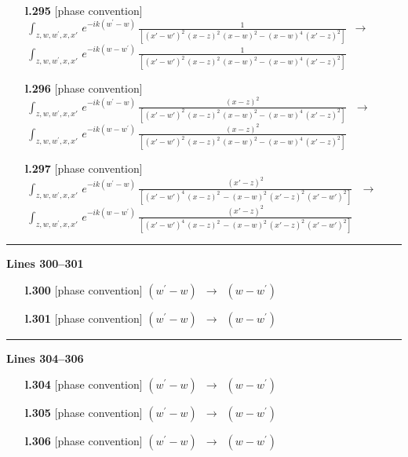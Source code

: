 \documentclass[10pt]{article}
\begin{document}
\begin{itemize}[leftmargin=2.2em,itemsep=1pt,topsep=2pt]
\item[\textbf{l.295}] \textsf{\small [phase convention]} $\displaystyle \,\int_{z,w,w^{\prime},x,x'}\, e^{-ik(w^{\prime}-w)}\, \frac{1}{[(x'-w')^{2}\,(x-z)^{2}\,(x-w)^{2} - (x-w)^{4}\, (x'-z)^{2}]}$\ $\longrightarrow$\ $\displaystyle \,\int_{z,w,w^{\prime},x,x'}\, e^{-ik(w-w^{\prime})}\, \frac{1}{[(x'-w')^{2}\,(x-z)^{2}\,(x-w)^{2} - (x-w)^{4}\, (x'-z)^{2}]}$
\item[\textbf{l.296}] \textsf{\small [phase convention]} $\displaystyle \,\int_{z,w,w^{\prime},x,x'}\, e^{-ik(w^{\prime}-w)}\, \frac{(x-z)^{2}}{[(x'-w')^{2}\,(x-z)^{2}\,(x-w)^{2} - (x-w)^{4}\, (x'-z)^{2}]}\,$\ $\longrightarrow$\ $\displaystyle \,\int_{z,w,w^{\prime},x,x'}\, e^{-ik(w-w^{\prime})}\, \frac{(x-z)^{2}}{[(x'-w')^{2}\,(x-z)^{2}\,(x-w)^{2} - (x-w)^{4}\, (x'-z)^{2}]}\,$
\item[\textbf{l.297}] \textsf{\small [phase convention]} $\displaystyle \,\int_{z,w,w^{\prime},x,x'}\, e^{-ik(w^{\prime}-w)}\, \frac{(x'-z)^{2}}{[(x'-w')^{4}\,(x-z)^{2}\, - (x-w)^{2}\, (x'-z)^{2}\,(x'-w')^{2}]}\,$\ $\longrightarrow$\ $\displaystyle \,\int_{z,w,w^{\prime},x,x'}\, e^{-ik(w-w^{\prime})}\, \frac{(x'-z)^{2}}{[(x'-w')^{4}\,(x-z)^{2}\, - (x-w)^{2}\, (x'-z)^{2}\,(x'-w')^{2}]}\,$
\end{itemize}
\noindent\rule{\linewidth}{0.3pt}\par\noindent\textbf{Lines 300--301} \par
\begin{itemize}[leftmargin=2.2em,itemsep=1pt,topsep=2pt]
\item[\textbf{l.300}] \textsf{\small [phase convention]} $\displaystyle (w^{\prime}-w)$\ $\longrightarrow$\ $\displaystyle (w-w^{\prime})$
\item[\textbf{l.301}] \textsf{\small [phase convention]} $\displaystyle (w^{\prime}-w)$\ $\longrightarrow$\ $\displaystyle (w-w^{\prime})$
\end{itemize}
\noindent\rule{\linewidth}{0.3pt}\par\noindent\textbf{Lines 304--306} \par
\begin{itemize}[leftmargin=2.2em,itemsep=1pt,topsep=2pt]
\item[\textbf{l.304}] \textsf{\small [phase convention]} $\displaystyle (w^{\prime}-w)$\ $\longrightarrow$\ $\displaystyle (w-w^{\prime})$
\item[\textbf{l.305}] \textsf{\small [phase convention]} $\displaystyle (w^{\prime}-w)$\ $\longrightarrow$\ $\displaystyle (w-w^{\prime})$
\item[\textbf{l.306}] \textsf{\small [phase convention]} $\displaystyle (w^{\prime}-w)$\ $\longrightarrow$\ $\displaystyle (w-w^{\prime})$
\end{itemize}
\end{document}
